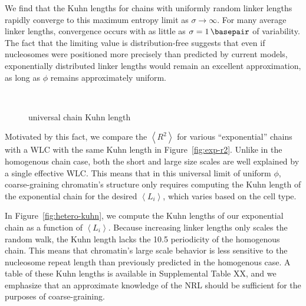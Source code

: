 \documentclass[%
 reprint,
superscriptaddress,
showpacs,preprintnumbers,
 amsmath,amssymb,
 aps,
 prl,
]{revtex4-1}
\newcommand{\RR}{\left\langle{}R^2\right\rangle{}}
\newcommand{\meanli}{\left\langle{}L_i\right\rangle}
\begin{document}
We find that the Kuhn lengths for chains with uniformly random linker lengths rapidly converge to this
maximum entropy limit as $\sigma\to\infty$. For many average linker lengths,
convergence occurs with as little as $\sigma=\SI{1}{\basepair}$ of variability.
The fact that the limiting value is distribution-free suggests that even if nucleosomes were positioned more precisely than predicted by current models, exponentially distributed linker lengths would remain an excellent approximation, as long as $\phi$ remains approximately uniform.

\begin{figure}
    \centering
    \mbox{%
    }\caption{universal chain Kuhn length}\label{fig:exp-chain}
\end{figure}


Motivated by this fact, we compare the $\RR$ for various
    ``exponential'' chains  with a WLC with the same Kuhn length in Figure~\ref{fig:exp-r2}.
Unlike in the homogenous chain case, both the short and large size scales are
    well explained by a single effective WLC.\@
This means that in this universal limit of uniform $\phi$, coarse-graining
    chromatin's structure only requires  computing the Kuhn length of the
    exponential chain for the desired $\meanli$, which varies based on the cell
    type.

In Figure~\ref{fig:hetero-kuhn}, we compute the Kuhn lengths of our exponential
    chain as a function of $\meanli$.
Because increasing linker lengths only scales the random walk, the Kuhn length
    lacks the \SI{10.5}{\basepair} periodicity of the homogenous chain.
This means that chromatin's large scale behavior is less sensitive to
    the nucleosome repeat length than previously predicted in the homogenous
    case.
A table of these Kuhn lengths is available in Supplemental Table XX, and we
    emphasize that an approximate knowledge of the NRL should be sufficient for
    the purposes of coarse-graining.
\end{document}
